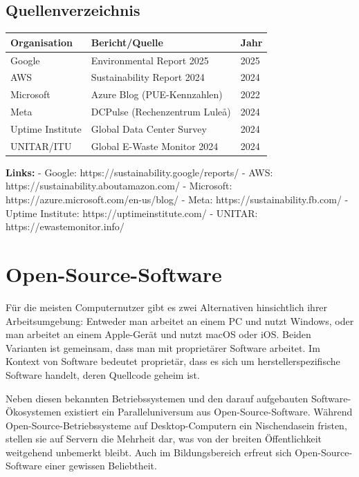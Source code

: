 \documentclass[
  nswissgerman,
  a4paper,
  DIV=11,
  numbers=noendperiod,
  ngerman]{scrreprt}
\newcounter{none} %
\begin{document}
\section{Quellenverzeichnis}\label{quellenverzeichnis}

{\def\LTcaptype{none} %
\begin{longtable}[]{@{}lll@{}}
\toprule\noalign{}
Organisation & Bericht/Quelle & Jahr \\
\midrule\noalign{}
\endhead
\bottomrule\noalign{}
\endlastfoot
Google & Environmental Report 2025 & 2025 \\
AWS & Sustainability Report 2024 & 2024 \\
Microsoft & Azure Blog (PUE-Kennzahlen) & 2022 \\
Meta & DCPulse (Rechenzentrum Luleå) & 2024 \\
Uptime Institute & Global Data Center Survey & 2024 \\
UNITAR/ITU & Global E-Waste Monitor 2024 & 2024 \\
\end{longtable}
}

\textbf{Links:} - Google: https://sustainability.google/reports/ - AWS:
https://sustainability.aboutamazon.com/ - Microsoft:
https://azure.microsoft.com/en-us/blog/ - Meta:
https://sustainability.fb.com/ - Uptime Institute:
https://uptimeinstitute.com/ - UNITAR: https://ewastemonitor.info/

\chapter{Open-Source-Software}\label{open-source-software}

Für die meisten Computernutzer gibt es zwei Alternativen hinsichtlich
ihrer Arbeitsumgebung: Entweder man arbeitet an einem PC und nutzt
Windows, oder man arbeitet an einem Apple-Gerät und nutzt macOS oder
iOS. Beiden Varianten ist gemeinsam, dass man mit proprietärer Software
arbeitet. Im Kontext von Software bedeutet proprietär, dass es sich um
herstellerspezifische Software handelt, deren Quellcode geheim ist.

Neben diesen bekannten Betriebssystemen und den darauf aufgebauten
Software-Ökosystemen existiert ein Paralleluniversum aus
Open-Source-Software. Während Open-Source-Betriebssysteme auf
Desktop-Computern ein Nischendasein fristen, stellen sie auf Servern die
Mehrheit dar, was von der breiten Öffentlichkeit weitgehend unbemerkt
bleibt. Auch im Bildungsbereich erfreut sich Open-Source-Software einer
gewissen Beliebtheit.
\end{document}
